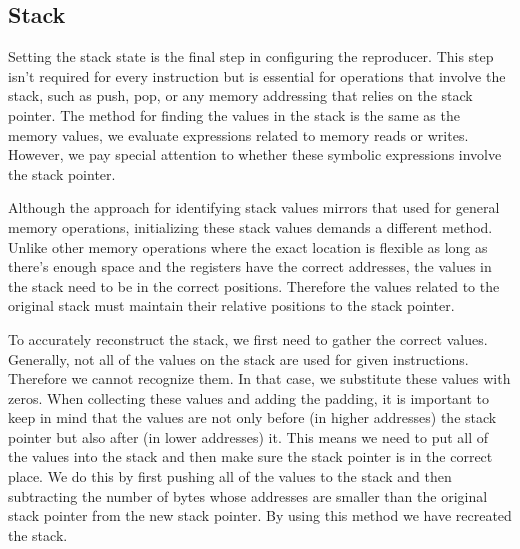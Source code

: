 \subsection{Stack}
Setting the stack state is the final step in configuring the reproducer.
This step isn't required for every instruction but is essential for operations that involve the stack, such as push, pop, or any memory addressing that relies on the stack pointer.
The method for finding the values in the stack is the same as the memory values, we evaluate expressions related to memory reads or writes.
However, we pay special attention to whether these symbolic expressions involve the stack pointer.

Although the approach for identifying stack values mirrors that used for general memory operations, initializing these stack values demands a different method.
Unlike other memory operations where the exact location is flexible as long as there's enough space and the registers have the correct addresses, the values in the stack need to be in the correct positions.
Therefore the values related to the original stack must maintain their relative positions to the stack pointer.

To accurately reconstruct the stack, we first need to gather the correct values.
Generally, not all of the values on the stack are used for given instructions.
Therefore we cannot recognize them.
In that case, we substitute these values with zeros.
When collecting these values and adding the padding, it is important to keep in mind that the values are not only before (in higher addresses) the stack pointer but also after (in lower addresses) it.
This means we need to put all of the values into the stack and then make sure the stack pointer is in the correct place.
We do this by first pushing all of the values to the stack and then subtracting the number of bytes whose addresses are smaller than the original stack pointer from the new stack pointer.
By using this method we have recreated the stack.

